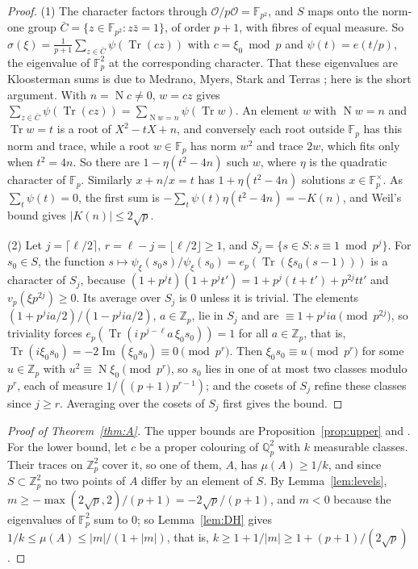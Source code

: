 \documentclass[11pt,a4paper]{amsart}
\theoremstyle{remark}
\newcommand{\F}{\mathbb{F}}
\newcommand{\Q}{\mathbb{Q}}
\newcommand{\Z}{\mathbb{Z}}
\newcommand{\Oo}{\mathcal{O}}
\newcommand{\Tr}{\operatorname{Tr}}
\newcommand{\N}{\operatorname{N}}
\begin{document}
\begin{proof}
(1) The character factors through $\Oo/p\Oo=\F_{p^2}$, and $S$ maps onto the norm-one group
$\bar C=\{z\in\F_{p^2}:z\bar z=1\}$, of order $p+1$, with fibres of equal measure. So
$\hat\sigma(\xi)=\frac1{p+1}\sum_{z\in\bar C}\psi(\Tr(cz))$ with $c=\xi_0\bmod p$ and $\psi(t)=e(t/p)$, the
eigenvalue of $\F_p^2$ at the corresponding character. That these eigenvalues are Kloosterman sums is due to
Medrano, Myers, Stark and Terras \cite{MMST}; here is the short argument. With $n=\N c\ne0$, $w=cz$ gives
$\sum_{z\in\bar C}\psi(\Tr(cz))=\sum_{\N w=n}\psi(\Tr w)$. An element $w$ with $\N w=n$ and $\Tr w=t$ is a root of
$X^2-tX+n$, and conversely each root outside $\F_p$ has this norm and trace, while a root $w\in\F_p$ has norm
$w^2$ and trace $2w$, which fits only when $t^2=4n$. So there are $1-\eta(t^2-4n)$ such $w$, where $\eta$ is the
quadratic character of $\F_p$. Similarly $x+n/x=t$ has $1+\eta(t^2-4n)$ solutions $x\in\F_p^\times$. As
$\sum_t\psi(t)=0$, the first sum is $-\sum_t\psi(t)\eta(t^2-4n)=-K(n)$, and Weil's bound \cite{Weil} gives
$|K(n)|\le2\sqrt p$.

(2) Let $j=\lceil\ell/2\rceil$, $r=\ell-j=\lfloor\ell/2\rfloor\ge1$, and $S_j=\{s\in S:s\equiv1\bmod p^j\}$. For
$s_0\in S$, the function $s\mapsto\psi_\xi(s_0s)/\psi_\xi(s_0)=e_p(\Tr(\xi s_0(s-1)))$ is a character of $S_j$,
because $(1+p^jt)(1+p^jt')=1+p^j(t+t')+p^{2j}tt'$ and $v_p(\xi p^{2j})\ge0$. Its average over $S_j$ is $0$
unless it is trivial. The elements $(1+p^jia/2)/(1-p^jia/2)$, $a\in\Z_p$, lie in $S_j$ and are
$\equiv1+p^jia\pmod{p^{2j}}$, so triviality forces $e_p(\Tr(i\,p^{j-\ell}a\,\xi_0s_0))=1$ for all $a\in\Z_p$, that
is, $\Tr(i\xi_0s_0)=-2\operatorname{Im}(\xi_0s_0)\equiv0\pmod{p^r}$. Then $\xi_0s_0\equiv u\pmod{p^r}$ for some
$u\in\Z_p$ with $u^2\equiv\N\xi_0\pmod{p^r}$, so $s_0$ lies in one of at most two classes modulo $p^r$, each of
measure $1/((p+1)p^{r-1})$; and the cosets of $S_j$ refine these classes since $j\ge r$. Averaging over the cosets
of $S_j$ first gives the bound.
\end{proof}

\begin{proof}[Proof of Theorem~\ref{thm:A}]
The upper bounds are Proposition~\ref{prop:upper} and \cite[Theorem~1]{Vinh}. For the lower bound, let $c$ be a
proper colouring of $\Q_p^2$ with $k$ measurable classes. Their traces on $\Z_p^2$ cover it, so one of them, $A$,
has $\mu(A)\ge1/k$, and since $S\subset\Z_p^2$ no two points of $A$ differ by an element of $S$. By
Lemma~\ref{lem:levels}, $m\ge-\max(2\sqrt p,2)/(p+1)=-2\sqrt p/(p+1)$, and $m<0$ because the eigenvalues of
$\F_p^2$ sum to $0$; so Lemma~\ref{lem:DH} gives $1/k\le\mu(A)\le|m|/(1+|m|)$, that is,
$k\ge1+1/|m|\ge1+(p+1)/(2\sqrt p)$.
\end{proof}
\end{document}
